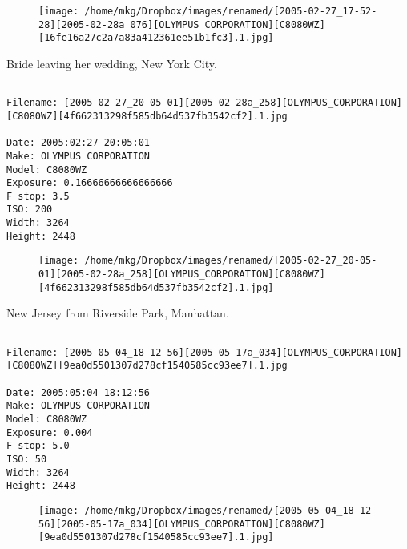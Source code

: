 \begin{figure}
\texttt{[image: /home/mkg/Dropbox/images/renamed/[2005-02-27\_17-52-28][2005-02-28a\_076][OLYMPUS\_CORPORATION][C8080WZ][16fe16a27c2a7a83a412361ee51b1fc3].1.jpg]}
\end{figure}
    
\clearpage
\onecolumn
\noindent Bride leaving her wedding, New York City.
\noindent
\begin{lstlisting}

Filename: [2005-02-27_20-05-01][2005-02-28a_258][OLYMPUS_CORPORATION][C8080WZ][4f662313298f585db64d537fb3542cf2].1.jpg

Date: 2005:02:27 20:05:01
Make: OLYMPUS CORPORATION
Model: C8080WZ
Exposure: 0.16666666666666666
F stop: 3.5
ISO: 200
Width: 3264
Height: 2448
\end{lstlisting}
\clearpage

\begin{figure}
\texttt{[image: /home/mkg/Dropbox/images/renamed/[2005-02-27\_20-05-01][2005-02-28a\_258][OLYMPUS\_CORPORATION][C8080WZ][4f662313298f585db64d537fb3542cf2].1.jpg]}
\end{figure}
    
\clearpage
\onecolumn
\noindent New Jersey from Riverside Park, Manhattan.
\noindent
\begin{lstlisting}

Filename: [2005-05-04_18-12-56][2005-05-17a_034][OLYMPUS_CORPORATION][C8080WZ][9ea0d5501307d278cf1540585cc93ee7].1.jpg

Date: 2005:05:04 18:12:56
Make: OLYMPUS CORPORATION
Model: C8080WZ
Exposure: 0.004
F stop: 5.0
ISO: 50
Width: 3264
Height: 2448
\end{lstlisting}
\clearpage

\begin{figure}
\texttt{[image: /home/mkg/Dropbox/images/renamed/[2005-05-04\_18-12-56][2005-05-17a\_034][OLYMPUS\_CORPORATION][C8080WZ][9ea0d5501307d278cf1540585cc93ee7].1.jpg]}
\end{figure}
    
